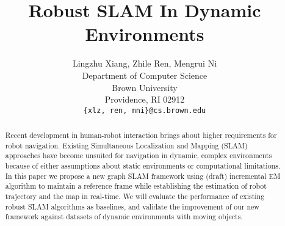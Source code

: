 \documentclass{article} %
\title{Robust SLAM In Dynamic Environments}
\author{
Lingzhu Xiang, Zhile Ren, Mengrui Ni \\
Department of Computer Science\\
Brown University\\
Providence, RI 02912 \\
\texttt{\{xlz, ren, mni\}@cs.brown.edu} \\
}
\begin{document}
\maketitle



\begin{abstract}
Recent development in human-robot interaction brings about higher requirements
for robot navigation. Existing Simultaneous Localization and Mapping (SLAM)
approaches have become unsuited for navigation in dynamic, complex
environments because of either assumptions about static environments or
computational limitations. In this paper we propose a new graph SLAM framework
using (draft) incremental EM algorithm to maintain a reference frame while
establishing the estimation of robot trajectory and the map in real-time. We
will evaluate the performance of existing robust SLAM algorithms as baselines,
and validate the improvement of our new framework against datasets of dynamic
environments with moving objects.
\end{abstract}











\end{document}
